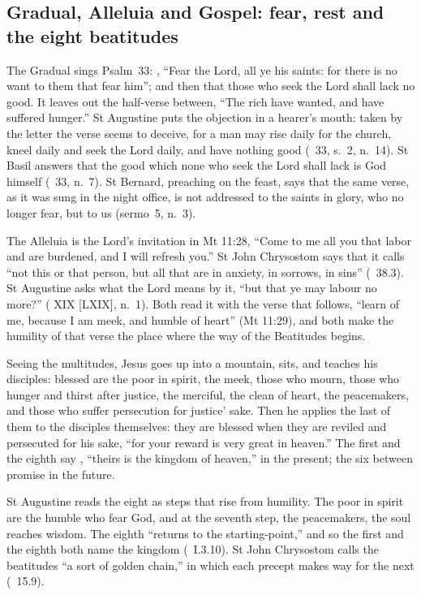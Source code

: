 \subsection{Gradual, Alleluia and Gospel: fear, rest and the eight beatitudes}

The Gradual sings Psalm~33: , ``Fear the Lord, all ye his saints: for there is
no want to them that fear him''; and then that those who seek the Lord shall
lack no good. It leaves out the half-verse between, ``The rich have wanted,
and have suffered hunger.'' St Augustine puts the objection in a hearer's
mouth: taken by the letter the verse seems to deceive, for a man may rise
daily for the church, kneel daily and seek the Lord daily, and have nothing
good (\ 33, s.~2, n.~14). St Basil answers that the good which none who seek the Lord shall lack is God himself (\ 33, n.~7). St Bernard, preaching on the feast, says that the same verse,
as it was sung in the night office, is not addressed to the saints in glory,
who no longer fear, but to us (sermo~5, n.~3).

The Alleluia is the Lord's invitation in Mt 11:28, ``Come to me all you that
labor and are burdened, and I will refresh you.'' St John Chrysostom says that
it calls ``not this or that person, but all that are in anxiety, in sorrows,
in sins'' (\ 38.3). St Augustine asks what the Lord means by it, ``but that ye may
labour no more?'' ( XIX [LXIX], n.~1). Both read it with the verse that follows, ``learn of me,
because I am meek, and humble of heart'' (Mt 11:29), and both make the
humility of that verse the place where the way of the Beatitudes begins.

Seeing the multitudes, Jesus goes up into a mountain, sits, and teaches his
disciples: blessed are the poor in spirit, the meek, those who mourn, those who
hunger and thirst after justice, the merciful, the clean of heart, the
peacemakers, and those who suffer persecution for justice' sake. Then he
applies the last of them to the disciples themselves: they are blessed when
they are reviled and persecuted for his sake, ``for your reward is very great in
heaven.'' The first and the eighth say ,
``theirs is the kingdom of heaven,'' in the present; the six between promise in
the future.

St Augustine reads the eight as steps that rise from humility. The poor in spirit are the humble who fear God, and at the seventh step, the
peacemakers, the soul reaches wisdom. The eighth ``returns to the starting-point,'' and so the first and the eighth both name the kingdom
(\ I.3.10). St John Chrysostom calls the
beatitudes ``a sort of golden chain,'' in which each precept makes way for the
next (\ 15.9).

